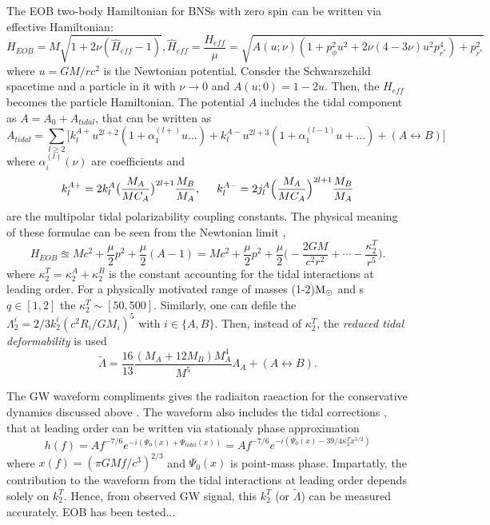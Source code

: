 The \ac{EOB} two-body Hamiltonian for \acp{BNS} with zero spin can be written via effective Hamiltonian:
%
\begin{equation}
    H_{EOB} = M\sqrt{1 + 2\nu (\hat{H}_{eff} - 1)}, 
    \hat{H}_{eff} = \frac{H_{eff}}{\mu} = \sqrt{A(u;\nu)(1 + p_{\phi}^2u^2 + 2\nu(4-3\nu)u^2p_{r^*}^4) + p_{r^*}^2}
\end{equation}
%
where $u=GM/rc^2$ is the Newtonian potential. 
Consder the Schwarszchild spacetime and a particle in it with $\nu\rightarrow0$ and 
$A(u;0) = 1-2u$. Then, the $H_{eff}$ becomes the particle Hamiltonian.
%
%
The potential $A$ includes the tidal component as $A = A_0 + A_{tidal}$, that can be 
written as \cite{40}
%
\begin{equation}
    A_{tidal} = \sum_{l\geq 2}\Big[ k_l^{A+}u^{2l+2}(1+\alpha_1^{(l+)}u ... ) + k_{l}^{A-}u^{2l+3}(1+\alpha_1^{(l-1)}u + ...) + (A\leftrightarrow B) \Big]
\end{equation}
%
where $\alpha_i^{(l)}(\nu)$ are coefficients and 
%
\begin{equation}
    k_{l}^{A+} = 2k_l^A\big( \frac{M_A}{MC_A} \big)^{2l+1}\frac{M_B}{M_A}, \hspace{5mm} k_l^{A-} = 2j_l^A\Big( \frac{M_A}{M C_A} \Big)^{2l + 1} \frac{M_B}{M_A}
\end{equation}
%
are the multipolar tidal polarizability coupling constants. 
%
The physical meaning of these formulae can be seen from the Newtonian limit \ie, 
%
\begin{equation}
    H_{EOB} \approxeq Mc^2 + \frac{\mu}{2}p^2 + \frac{\mu}{2}(A-1) = Mc^2 + \frac{\mu}{2}p^2 + \frac{\mu}{2}\Big( -\frac{2 G M}{c^2 r^2} + \cdots - \frac{\kappa_2^T}{r^5} \Big).
\end{equation}
%
where $\kappa_2^T = \kappa_2^A + \kappa_2^B$ is the constant accounting for the tidal 
interactions at leading order.
For a physically motivated range of masses (1-2)${\text{M}_{\odot}}$ and \mr{}s $q\in[1,2]$ the 
$\kappa_2^T\sim[50,500]$. 
Similarly, one can defile the $\Lambda_2^i = 2/3 k_2^i (c^2 R_i/GM_i)^5$ with $i\in\{A,B\}$.
Then, instead of $\kappa_2^T$, the \textit{reduced tidal deformability} is used
%
\begin{equation}
    \tilde{\Lambda} = \frac{16}{13}\frac{(M_A + 12M_B)M_A^4}{M^5}\Lambda_A + (A\leftrightarrow B).
\end{equation}
%

The \ac{GW} waveform compliments gives the radiaiton raeaction for the conservative 
dynamics discussed above \cite{41}. The waveform also includes the tidal corrections \cite{6,42},
that at leading order can be written via stationaly phase approximation 
%
\begin{equation}
    h(f) = Af^{-7/6}e^{-i(\Psi_0(x) + \Psi_{tidal}(x))} = Af^{-7/6}e^{-i(\Psi_0(x)-39/4\kappa_2^Tx^{5/2})}
\end{equation}
%
where $x(f) = (\pi G M f / c^3)^{2/3}$ and $\Psi_0(x)$ is point-mass phase.
%
Impartatly, the contribution to the waveform from the tidal interactions at leading order 
depends solely on $k_2^T$. 
Hence, from observed \ac{GW} signal, this $k_2^T$ (or $\tilde{\Lambda}$) can be measured 
accurately. 
%
\ac{EOB} has been tested...




